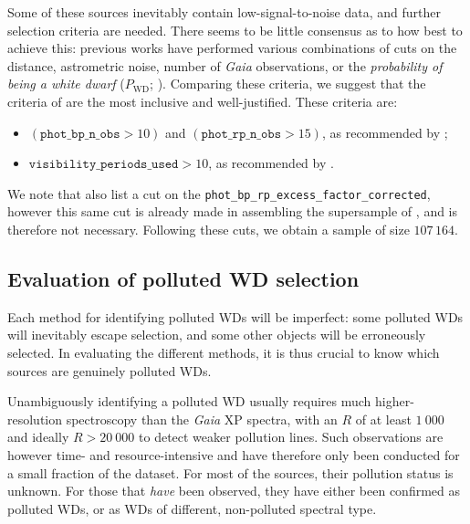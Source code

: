 \documentclass[fleqn,usenatbib]{rasti}
\newcommand{\Pwd}{P_\mathrm{WD}}
\begin{document}
Some of these sources inevitably contain low-signal-to-noise data, and further selection criteria are needed.
There seems to be little consensus as to how best to achieve this: previous works have performed various combinations of cuts on the distance, astrometric noise, number of \textit{Gaia} observations, or the \textit{probability of being a white dwarf} ($\Pwd$; \citealt{gentilefusillo15}).
Comparing these criteria, we suggest that the criteria of \citet{perezcouto24} are the most inclusive and well-justified.
These criteria are:
\begin{itemize}
\item $(\texttt{phot\_bp\_n\_obs} > 10)$ and $(\texttt{phot\_rp\_n\_obs} > 15)$, as recommended by \citet{andrae23};
\item $\texttt{visibility\_periods\_used} > 10$, as recommended by \citet{lindegren18}.
\end{itemize}
We note that \citet{perezcouto24} also list a cut on the \texttt{phot\_bp\_rp\_excess\_factor\_corrected}, however this same cut is already made in assembling the supersample of \citet[][their equation 21]{gentilefusillo21}, and is therefore not necessary.
Following these cuts, we obtain a sample of size $107\,164$.


\subsection{Evaluation of polluted WD selection} \label{sec:evaluation}

Each method for identifying polluted WDs will be imperfect: some polluted WDs will inevitably escape selection, and some other objects will be erroneously selected.
In evaluating the different methods, it is thus crucial to know which sources are genuinely polluted WDs.

Unambiguously identifying a polluted WD usually requires much higher-resolution spectroscopy than the \textit{Gaia} XP spectra, with an $R$ of at least $1~000$ and ideally $R>20~000$ to detect weaker pollution lines.
Such observations are however time- and resource-intensive and have therefore only been conducted for a small fraction of the dataset.
For most of the sources, their pollution status is unknown.
For those that \textit{have} been observed, they have either been confirmed as polluted WDs, or as WDs of different, non-polluted spectral type.
\end{document}
